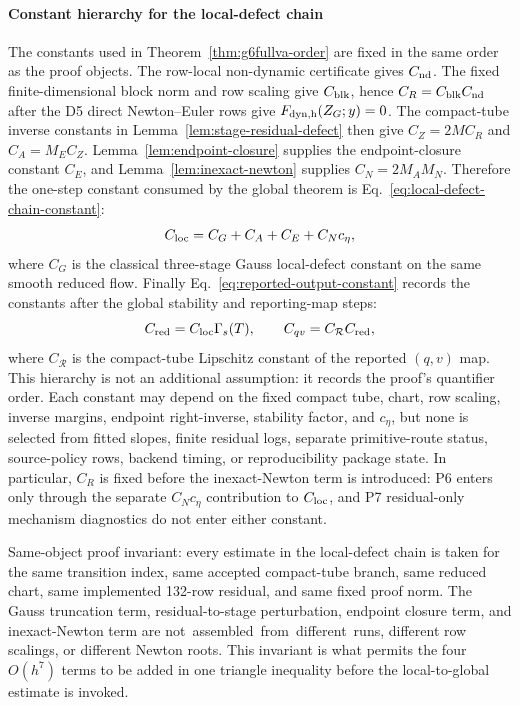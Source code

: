 \documentclass[preprint,12pt]{elsarticle}
\begin{document}
\paragraph{Constant hierarchy for the local-defect chain}
The constants used in Theorem~\ref{thm:g6fullva-order} are fixed in the same
order as the proof objects.  The row-local non-dynamic certificate gives
\(C_{\rm nd}\).  The fixed finite-dimensional block norm and row scaling give
\(C_{\rm blk}\), hence \(C_R=C_{\rm blk}C_{\rm nd}\) after the D5 direct
Newton--Euler rows give \(F_{\rm dyn,h}(Z_G;y)=0\).  The compact-tube inverse
constants in Lemma~\ref{lem:stage-residual-defect} then give
\(C_Z=2MC_R\) and \(C_A=M_EC_Z\).  Lemma~\ref{lem:endpoint-closure} supplies
the endpoint-closure constant \(C_E\), and Lemma~\ref{lem:inexact-newton}
supplies \(C_N=2M_AM_N\).  Therefore the one-step constant consumed by the
global theorem is Eq.~\eqref{eq:local-defect-chain-constant}:
\begin{equation}
\label{eq:local-defect-chain-constant}
  C_{\rm loc}=C_G+C_A+C_E+C_Nc_\eta ,
\end{equation}
where \(C_G\) is the classical three-stage Gauss local-defect constant on the
same smooth reduced flow.  Finally Eq.~\eqref{eq:reported-output-constant}
records the constants after the global stability and reporting-map steps:
\begin{equation}
\label{eq:reported-output-constant}
  C_{\rm red}=C_{\rm loc}\Gamma_s(T),\qquad
  C_{qv}=C_{\mathcal R}C_{\rm red},
\end{equation}
where \(C_{\mathcal R}\) is the compact-tube Lipschitz constant of the
reported \((q,v)\) map.  This hierarchy is not an additional assumption: it
records the proof's quantifier order.  Each constant may depend on the fixed
compact tube, chart, row scaling, inverse margins, endpoint right-inverse,
stability factor, and \(c_\eta\), but none is selected from fitted slopes,
finite residual logs, separate primitive-route status,
source-policy rows, backend timing, or reproducibility package state.
In particular, \(C_R\) is fixed before the inexact-Newton term is introduced:
P6 enters only through the separate \(C_Nc_\eta\) contribution to
\(C_{\rm loc}\), and P7 residual-only mechanism diagnostics do not enter
either constant.

Same-object proof invariant: every estimate in the local-defect chain is
taken for the same transition index, same accepted compact-tube branch, same
reduced chart, same implemented 132-row residual, and same fixed proof norm.
The Gauss truncation term, residual-to-stage perturbation, endpoint closure
term, and inexact-Newton term are \mbox{not assembled from different runs}, different
row scalings, or different Newton roots. This invariant is what permits the
four \(O(h^7)\) terms to be added in one triangle inequality before the
local-to-global estimate is invoked.
\end{document}
